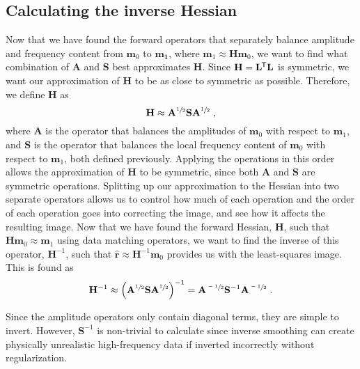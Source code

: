 \subsection{Calculating the inverse Hessian}
    Now that we have found the forward operators that separately balance amplitude and frequency content from $\mathbf{m}_0$ to $\mathbf{m_1}$, where $\mathbf{m}_1 \approx \mathbf{H} \mathbf{m}_0$, we want to find what combination of $\mathbf{A}$ and $\mathbf{S}$ best approximates $\mathbf{H}$.
    Since $\mathbf{H} = \mathbf{L}^{\mkern-1.5mu\mathsf{T}}\mathbf{L}$ is symmetric, we want our approximation of $\mathbf{H}$ to be as close to symmetric as possible.
    Therefore, we define $\mathbf{H}$ as
    \begin{equation}
        \mathbf{H} \approx \mathbf{A}^{\sfrac{1}{2}}\mathbf{S}\mathbf{A}^{\sfrac{1}{2}} \;,
    \end{equation}
    where $\mathbf{A}$ is the operator that balances the amplitudes of $\mathbf{m}_0$ with respect to $\mathbf{m}_1$, and $\mathbf{S}$ is the operator that balances the local frequency content of $\mathbf{m}_0$ with respect to $\mathbf{m}_1$, both defined previously.
    Applying the operations in this order allows the approximation of $\mathbf{H}$ to be symmetric, since both $\mathbf{A}$ and $\mathbf{S}$ are symmetric operations. 
    Splitting up our approximation to the Hessian into two separate operators allows us to control how much of each operation and the order of each operation goes into correcting the image, and see how it affects the resulting image.
    Now that we have found the forward Hessian, $\mathbf{H}$, such that $\mathbf{H}\mathbf{m}_0 \approx \mathbf{m}_1$ using data matching operators, we want to find the inverse of this operator, $\mathbf{H}^{-1}$, such that $\hat{\mathbf{r}} \approx \mathbf{H} ^{-1} \mathbf{m}_0$ provides us with the least-squares image.
    This is found as
    \begin{equation}
        \mathbf{H}^{-1} \approx \left ( \mathbf{A}^{\sfrac{1}{2}} \mathbf{S} \mathbf{A}^{\sfrac{1}{2}} \right )^{-1} = 
        \mathbf{A}^{\sfrac{-1}{2}} \mathbf{S}^{-1} \mathbf{A}^{\sfrac{-1}{2}}\;.
        \label{eq:invh}
    \end{equation}

    Since the amplitude operators only contain diagonal terms, they are simple to invert. 
    However, $\mathbf{S}^{-1}$ is non-trivial to calculate since inverse smoothing can create physically unrealistic high-frequency data if inverted incorrectly without regularization.

